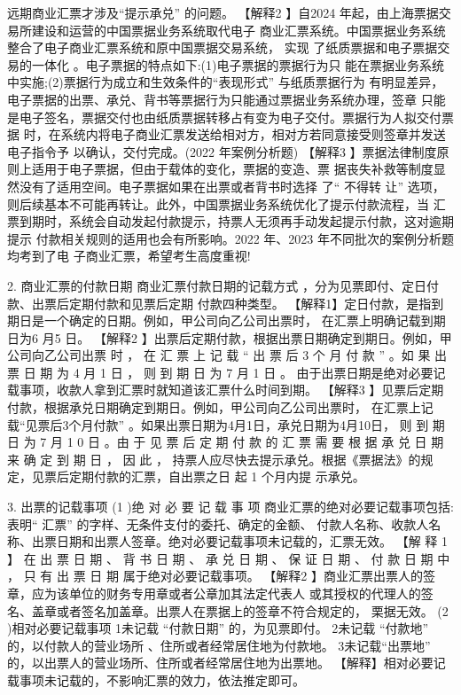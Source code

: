 \documentclass[UTF8,12pt]{ctexart}
\numberwithin{equation}{section} %
\numberwithin{figure}{section}
\numberwithin{table}{section}
\begin{document}
	远期商业汇票才涉及“提示承兑” 的问题。
	【解释2 】自2024 年起，由上海票据交易所建设和运营的中国票据业务系统取代电子 商业汇票系统。中国票据业务系统整合了电子商业汇票系统和原中国票据交易系统， 实现 了纸质票据和电子票据交易的一体化 。电子票据的特点如下:(1)电子票据的票据行为只 能在票据业务系统中实施;(2)票据行为成立和生效条件的“表现形式” 与纸质票据行为 有明显差异，电子票据的出票、承兑、背书等票据行为只能通过票据业务系统办理，签章 只能是电子签名，票据交付也由纸质票据转移占有变为电子交付。票据行为人拟交付票据 时，在系统内将电子商业汇票发送给相对方，相对方若同意接受则签章并发送电子指令予 以确认，交付完成。(2022 年案例分析题)
	【解释3 】票据法律制度原则上适用于电子票据，但由于载体的变化，票据的变造、票 据丧失补救等制度显然没有了适用空间。电子票据如果在出票或者背书时选择 了“ 不得转 让” 选项，则后续基本不可能再转让。此外，中国票据业务系统优化了提示付款流程，当 汇票到期时，系统会自动发起付款提示，持票人无须再手动发起提示付款，这对逾期提示 付款相关规则的适用也会有所影响。2022 年、2023 年不同批次的案例分析题均考到了电 子商业汇票，希望考生高度重视!
	
	2. 商业汇票的付款日期
	商业汇票付款日期的记载方式 ，分为见票即付、定日付款、出票后定期付款和见票后定期 付款四种类型。
	【解释1】定日付款，是指到期日是一个确定的日期。例如，甲公司向乙公司出票时， 在汇票上明确记载到期日为6 月5 日。
	【解释2 】出票后定期付款，根据出票日期确定到期日。例如，甲公司向乙公司出票 时 ， 在 汇 票 上 记 载 “ 出 票 后 3 个 月 付 款 ” 。如 果 出 票 日 期 为 4 月 1 日 ， 则 到 期 日 为 7 月 1 日 。 由于出票日期是绝对必要记载事项，收款人拿到汇票时就知道该汇票什么时间到期。
	【解释3 】见票后定期付款，根据承兑日期确定到期日。例如，甲公司向乙公司出票时， 在汇票上记载“见票后3个月付款” 。如果出票日期为4月1日，承兑日期为4月10日， 则 到 期 日 为 7 月 1 0 日 。由 于 见 票 后 定 期 付 款 的 汇 票 需 要 根 据 承 兑 日 期 来 确 定 到 期 日 ， 因 此 ， 持票人应尽快去提示承兑。根据《票据法》的规定，见票后定期付款的汇票，自出票之日 起 1 个月内提 示承兑。
	
	3. 出票的记载事项
	(1 )绝 对 必 要 记 载 事 项
	商业汇票的绝对必要记载事项包括:表明“ 汇票” 的字样、无条件支付的委托、确定的金额、 付款人名称、收款人名称、出票日期和出票人签章。绝对必要记载事项未记载的，汇票无效。
	【解 释 1 】 在 出 票 日 期 、 背 书 日 期 、 承 兑 日 期 、 保 证 日 期 、 付 款 日 期 中 ， 只 有 出 票 日 期 属于绝对必要记载事项。
	【解释2 】商业汇票出票人的签章，应为该单位的财务专用章或者公章加其法定代表人 或其授权的代理人的签名、盖章或者签名加盖章。出票人在票据上的签章不符合规定的， 栗据无效。
	(2 )相对必要记载事项
	1未记载 “付款日期” 的，为见票即付。
	2未记载 “付款地” 的，以付款人的营业场所 、住所或者经常居住地为付款地。 3未记载“出票地” 的，以出票人的营业场所、住所或者经常居住地为出票地。
	【解释】相对必要记载事项未记载的，不影响汇票的效力，依法推定即可。
	
\end{document}
